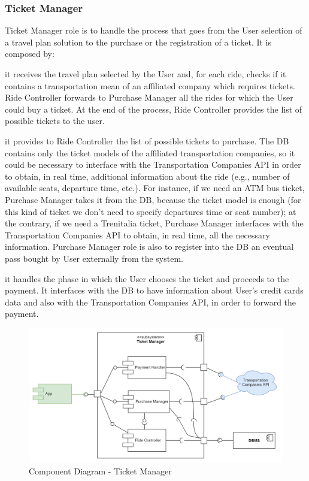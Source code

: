 	\filbreak
	\subsubsection{Ticket Manager}
		\label{sect:TicketManager}
		Ticket Manager role is to handle the process that goes from the User selection of a travel plan solution to the purchase or the registration of a ticket.\newline
		It is composed by:
		\begin{description}[before={\renewcommand{\makelabel}[1]{-- \textit{##1}:}}]
			\item[Ride Controller] it receives the travel plan selected by the User and, for each ride, checks if it contains a transportation mean of an affiliated company which requires tickets. Ride Controller forwards to Purchase Manager all the rides for which the User could buy a ticket. At the end of the process, Ride Controller provides the list of possible tickets to the user.
			\item[Purchase Manager] it provides to Ride Controller the list of possible tickets to purchase. The DB contains only the ticket models of the affiliated transportation companies, so it could be necessary to interface with the Transportation Companies API in order to obtain, in real time, additional information about the ride (e.g., number of available seats, departure time, etc.). For instance, if we need an ATM bus ticket, Purchase Manager takes it from the DB, because the ticket model is enough (for this kind of ticket we don't need to specify departures time or seat number); at the contrary, if we need a Trenitalia ticket, Purchase Manager interfaces with the Transportation Companies API to obtain, in real time, all the necessary information. \newline
			Purchase Manager role is also to register into the DB an eventual pass bought by User externally from the system.
			\item[Payment Handler] it handles the phase in which the User chooses the ticket and proceeds to the payment. It interfaces with the DB to have information about User's credit cards data and also with the Transportation Companies API, in order to forward the payment.  
		\end{description}

		\begin{figure}[H]
			\centerline{\includegraphics[width=0.9\paperwidth]{Images/CD_TicketManager}}
			\caption{Component Diagram - Ticket Manager}
		\end{figure}
\filbreak
